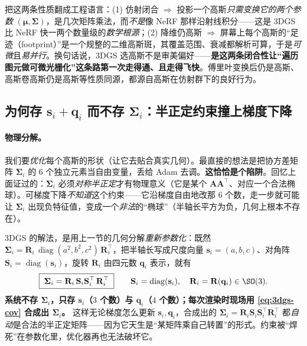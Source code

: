 \begin{insight}
把这两条性质翻成工程语言：(1) 仿射闭合 $\Rightarrow$ 投影一个高斯\emph{只需变换它的两个参数} $(\boldsymbol\mu,\boldsymbol\Sigma)$，是几次矩阵乘法，而\emph{不是}像 NeRF 那样沿射线积分——这是 3DGS 比 NeRF 快一两个数量级的\emph{数学根源}；(2) 降维仍高斯 $\Rightarrow$ 屏幕上每个高斯的“足迹（footprint）”是一个规整的二维高斯斑，其覆盖范围、衰减都解析可算，于是\emph{可微}且\emph{易并行}。换句话说，3DGS 选高斯不是审美偏好——\textbf{是这两条闭合性让“遍历图元做可微光栅化”这条路第一次走得通、且走得飞快}。傅里叶变换后仍是高斯、高斯卷高斯仍是高斯等性质同源，都源自高斯在仿射群下的良好行为。
\end{insight}

\subsection{为何存 $\mathbf s_i+\mathbf q_i$ 而不存 $\boldsymbol\Sigma_i$：半正定约束撞上梯度下降}
\label{sec:3dgs-store}

\paragraph{物理分解。}
我们要\emph{优化}每个高斯的形状（让它去贴合真实几何）。最直接的想法是把协方差矩阵 $\boldsymbol\Sigma_i$ 的 $6$ 个独立元素当自由变量，丢给 Adam 去调。\textbf{这恰恰是个陷阱}。回忆上面证过的：$\boldsymbol\Sigma_i$ 必须\emph{对称半正定}才有物理意义（它是某个 $\mathbf A\mathbf A^\top$、对应一个合法椭球）。可梯度下降\emph{不知道}这个约束——它沿梯度自由地改那 $6$ 个数，走一步就可能让 $\boldsymbol\Sigma_i$ 出现负特征值，变成一个\emph{非法}的“椭球”（半轴长平方为负，几何上根本不存在）。

3DGS 的解法，是用上一节的几何分解\emph{重新参数化}：既然 $\boldsymbol\Sigma_i=\mathbf R_i\,\operatorname{diag}(a^2,b^2,c^2)\,\mathbf R_i^\top$，把半轴长写成尺度向量 $\mathbf s_i=(a,b,c)$、对角阵 $\mathbf S_i=\operatorname{diag}(\mathbf s_i)$，旋转 $\mathbf R_i$ 由四元数 $\mathbf q_i$ 表示，就有
\begin{equation}
  \boxed{\;\boldsymbol\Sigma_i=\mathbf R_i\,\mathbf S_i\mathbf S_i^\top\,\mathbf R_i^\top\;}\qquad
  \mathbf S_i=\operatorname{diag}(\mathbf s_i),\quad \mathbf R_i=\mathbf R(\mathbf q_i)\in\SO(3).
  \label{eq:3dgs-cov}
\end{equation}
\textbf{系统不存 $\boldsymbol\Sigma_i$，只存 $\mathbf s_i$（$3$ 个数）与 $\mathbf q_i$（$4$ 个数）；每次渲染时现场用 \cref{eq:3dgs-cov} 合成出 $\boldsymbol\Sigma_i$。} 这样无论梯度怎么更新 $\mathbf s_i,\mathbf q_i$，合成出的 $\boldsymbol\Sigma_i=\mathbf R_i\mathbf S_i\mathbf S_i^\top\mathbf R_i^\top$ 都\emph{自动}是合法的半正定矩阵——因为它天生是“某矩阵乘自己转置”的形式。约束被“焊死”在参数化里，优化器再也无法破坏它。

